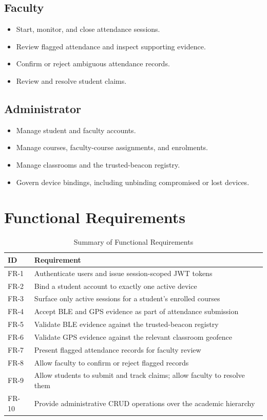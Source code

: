 \documentclass[12pt, a4paper, oneside]{report}
\begin{document}
\subsection{Faculty}
\begin{itemize}
    \item Start, monitor, and close attendance sessions.
    \item Review flagged attendance and inspect supporting evidence.
    \item Confirm or reject ambiguous attendance records.
    \item Review and resolve student claims.
\end{itemize}

\subsection{Administrator}
\begin{itemize}
    \item Manage student and faculty accounts.
    \item Manage courses, faculty-course assignments, and enrolments.
    \item Manage classrooms and the trusted-beacon registry.
    \item Govern device bindings, including unbinding compromised or lost devices.
\end{itemize}

\section{Functional Requirements}

\begin{table}[htbp]
\centering
\caption{Summary of Functional Requirements}
\label{tab:func-req}
\begin{tabularx}{\textwidth}{|l|X|}
\hline
\textbf{ID} & \textbf{Requirement} \\
\hline
FR-1 & Authenticate users and issue session-scoped JWT tokens \\
\hline
FR-2 & Bind a student account to exactly one active device \\
\hline
FR-3 & Surface only active sessions for a student's enrolled courses \\
\hline
FR-4 & Accept BLE and GPS evidence as part of attendance submission \\
\hline
FR-5 & Validate BLE evidence against the trusted-beacon registry \\
\hline
FR-6 & Validate GPS evidence against the relevant classroom geofence \\
\hline
FR-7 & Present flagged attendance records for faculty review \\
\hline
FR-8 & Allow faculty to confirm or reject flagged records \\
\hline
FR-9 & Allow students to submit and track claims; allow faculty to resolve them \\
\hline
FR-10 & Provide administrative CRUD operations over the academic hierarchy \\
\hline
\end{tabularx}
\end{table}
\end{document}
